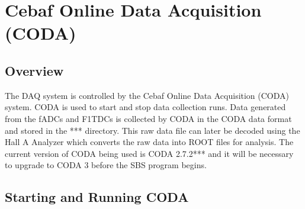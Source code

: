 \documentclass[oneside]{book}   %
\begin{document}
\section{Cebaf Online Data Acquisition (CODA)}
\label{sec:coda}

\subsection{Overview}
\label{ssec:coda_overview}

The DAQ system is controlled by the Cebaf Online Data Acquisition (CODA) system. CODA is used to start and stop data collection runs. Data generated from the fADCs and F1TDCs is collected by CODA in the CODA data format and stored in the *** directory. This raw data file can later be decoded using the Hall A Analyzer which converts the raw data into ROOT files for analysis. The current version of CODA being used is CODA 2.7.2*** and it will be necessary to upgrade to CODA 3 before the SBS program begins.

\subsection{Starting and Running CODA}
\label{ssec:running_coda}
\end{document}
